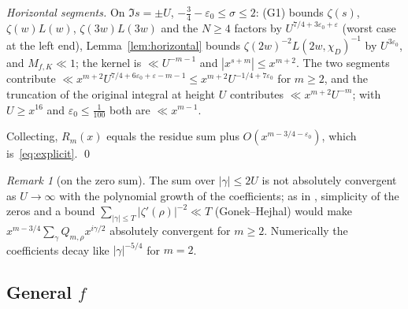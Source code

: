 \documentclass[11pt,a4paper]{article}
\theoremstyle{remark}\newtheorem{remark}[theorem]{Remark}
\begin{document}
\emph{Horizontal segments.} On $\Im s=\pm U$, $-\tfrac34-\varepsilon_0\le\sigma\le2$: (G1) bounds $\zeta(s)$,
$\zeta(w)L(w)$, $\zeta(3w)L(3w)$ and the $N\ge4$ factors by $U^{7/4+3\varepsilon_0+\varepsilon}$ (worst case at the left end),
Lemma~\ref{lem:horizontal} bounds $\zeta(2w)^{-2}L(2w,\chi_D)^{-1}$ by $U^{3\varepsilon_0}$, and $M_{f,K}\ll1$; the kernel
is $\ll U^{-m-1}$ and $|x^{s+m}|\le x^{m+2}$. The two segments contribute
$\ll x^{m+2}U^{7/4+6\varepsilon_0+\varepsilon-m-1}\le x^{m+2}U^{-1/4+7\varepsilon_0}$ for $m\ge2$, and the truncation of
the original integral at height $U$ contributes $\ll x^{m+2}U^{-m}$; with $U\ge x^{16}$ and $\varepsilon_0\le\tfrac1{100}$
both are $\ll x^{m-1}$.

Collecting, $R_m(x)$ equals the residue sum plus $O(x^{m-3/4-\varepsilon_0})$, which is~\eqref{eq:explicit}. \qed

\begin{remark}[on the zero sum]
The sum over $|\gamma|\le2U$ is not absolutely convergent as $U\to\infty$ with the polynomial growth of the
coefficients; as in \cite[Theorem~3]{GoldstonSuriajaya2021}, simplicity of the zeros and a bound
$\sum_{|\gamma|\le T}|\zeta'(\rho)|^{-2}\ll T$ (Gonek--Hejhal) would make $x^{m-3/4}\sum_\gamma Q_{m,\rho}x^{i\gamma/2}$
absolutely convergent for $m\ge2$. Numerically the coefficients decay like $|\gamma|^{-5/4}$ for $m=2$.
\end{remark}

\subsection{General $f$}
\end{document}
